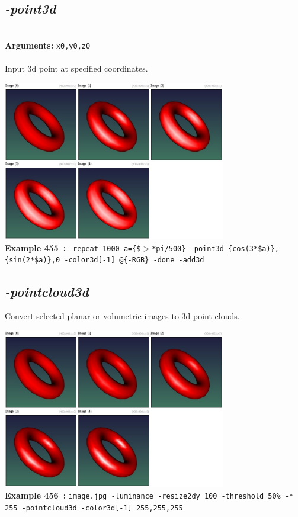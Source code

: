 \documentclass[a4paper,11pt,twoside]{book}
\begin{document}
\subsection{\emph{-point3d} }\vspace*{-0.5em}
~\\\textbf{Arguments: } 
{\small \texttt{x0,y0,z0}}\\~\\
Input 3d point at specified coordinates.
\begin{center}\includegraphics[keepaspectratio=true,height=7cm,width=\textwidth]{img/gmic_def455.jpg}\\
{\footnotesize \textbf{Example 455~:} \texttt{-repeat 1000 a=\{\$$>$*pi/500\} -point3d \{cos(3*\$a)\},\{sin(2*\$a)\},0 -color3d[-1] @\{-RGB\} -done -add3d}}
\end{center}

\subsection{\emph{-pointcloud3d} }\vspace*{-0.5em}
Convert selected planar or volumetric images to 3d point clouds.
\begin{center}\includegraphics[keepaspectratio=true,height=7cm,width=\textwidth]{img/gmic_def456.jpg}\\
{\footnotesize \textbf{Example 456~:} \texttt{image.jpg -luminance -resize2dy 100 -threshold 50\% -* 255 -pointcloud3d -color3d[-1] 255,255,255}}
\end{center}
\end{document}
